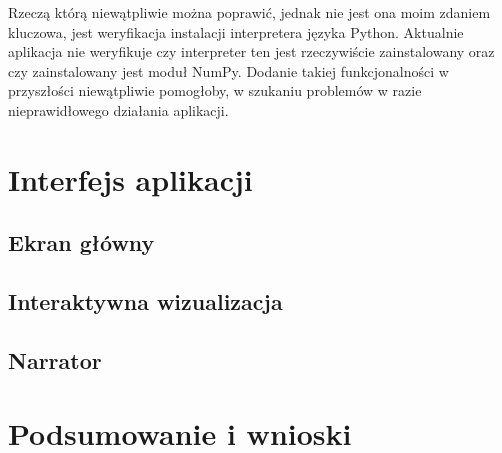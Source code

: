 \documentclass{SGGW-thesis}
\begin{document}
	Rzeczą którą niewątpliwie można poprawić, jednak nie jest ona moim zdaniem kluczowa, jest weryfikacja instalacji interpretera języka Python. Aktualnie aplikacja nie weryfikuje czy interpreter ten jest rzeczywiście zainstalowany oraz czy zainstalowany jest moduł NumPy. Dodanie takiej funkcjonalności w przyszłości niewątpliwie pomogłoby, w szukaniu problemów w razie nieprawidłowego działania aplikacji.
	

\chapter{Interfejs aplikacji}
	\section{Ekran główny}
	\section{Interaktywna wizualizacja}
	\section{Narrator}
	
\chapter{Podsumowanie i wnioski}
\end{document}
